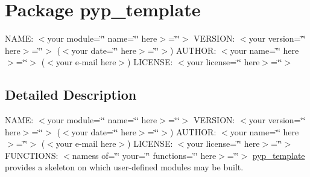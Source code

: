 \hypertarget{namespacepyp__template}{
\section{Package pyp\_\-template}
\label{namespacepyp__template}
}


NAME: $<$your module=\char`\"{}\char`\"{} name=\char`\"{}\char`\"{} here$>$=\char`\"{}\char`\"{}$>$ VERSION: $<$your version=\char`\"{}\char`\"{} here$>$=\char`\"{}\char`\"{}$>$ ($<$your date=\char`\"{}\char`\"{} here$>$=\char`\"{}\char`\"{}$>$) AUTHOR: $<$your name=\char`\"{}\char`\"{} here$>$=\char`\"{}\char`\"{}$>$ ($<$your e-\/mail here$>$) LICENSE: $<$your license=\char`\"{}\char`\"{} here$>$=\char`\"{}\char`\"{}$>$  




\subsection{Detailed Description}
NAME: $<$your module=\char`\"{}\char`\"{} name=\char`\"{}\char`\"{} here$>$=\char`\"{}\char`\"{}$>$ VERSION: $<$your version=\char`\"{}\char`\"{} here$>$=\char`\"{}\char`\"{}$>$ ($<$your date=\char`\"{}\char`\"{} here$>$=\char`\"{}\char`\"{}$>$) AUTHOR: $<$your name=\char`\"{}\char`\"{} here$>$=\char`\"{}\char`\"{}$>$ ($<$your e-\/mail here$>$) LICENSE: $<$your license=\char`\"{}\char`\"{} here$>$=\char`\"{}\char`\"{}$>$ FUNCTIONS: $<$namess of=\char`\"{}\char`\"{} your=\char`\"{}\char`\"{} functions=\char`\"{}\char`\"{} here$>$=\char`\"{}\char`\"{}$>$ \hyperlink{namespacepyp__template}{pyp\_\-template} provides a skeleton on which user-\/defined modules may be built. 